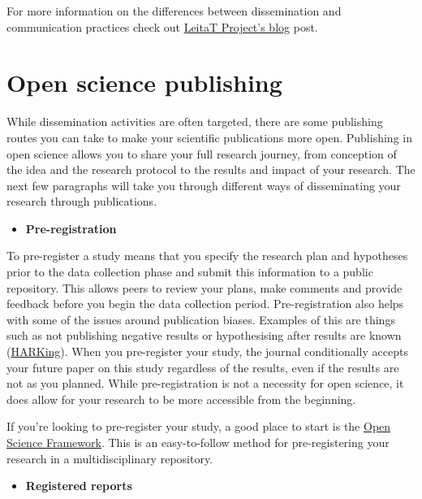 \documentclass[
]{book}
\providecommand{\tightlist}{%
  \setlength{\itemsep}{0pt}\setlength{\parskip}{0pt}}
\begin{document}
For more information on the differences between dissemination and communication practices check out \href{https://projects.leitat.org/communication-vs-dissemination-whats-the-difference/}{LeitaT Project's blog} post.

\hypertarget{open-science-publishing}{%
\section{Open science publishing}\label{open-science-publishing}}

While dissemination activities are often targeted, there are some publishing routes you can take to make your scientific publications more open. Publishing in open science allows you to share your full research journey, from conception of the idea and the research protocol to the results and impact of your research. The next few paragraphs will take you through different ways of disseminating your research through publications.

\begin{itemize}
\tightlist
\item
  \textbf{Pre-registration}
\end{itemize}

To pre-register a study means that you specify the research plan and hypotheses prior to the data collection phase and submit this information to a public repository. This allows peers to review your plans, make comments and provide feedback before you begin the data collection period. Pre-registration also helps with some of the issues around publication biases. Examples of this are things such as not publishing negative results or hypothesising after results are known (\href{https://pubmed.ncbi.nlm.nih.gov/15647155/}{HARKing}). When you pre-register your study, the journal conditionally accepts your future paper on this study regardless of the results, even if the results are not as you planned. While pre-registration is not a necessity for open science, it does allow for your research to be more accessible from the beginning.

If you're looking to pre-register your study, a good place to start is the \href{https://www.cos.io/initiatives/prereg}{Open Science Framework}. This is an easy-to-follow method for pre-registering your research in a multidisciplinary repository.

\begin{itemize}
\tightlist
\item
  \textbf{Registered reports}
\end{itemize}
\end{document}
